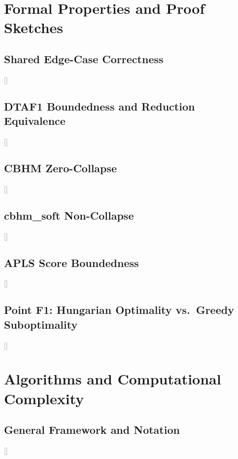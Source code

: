 \documentclass[sigconf]{acmart}
\newcommand{\tbd}[1]{\textcolor{gray}{[#1]}}
\begin{document}
\nocite{*}


\appendix

\section{Formal Properties and Proof Sketches}
\label{app:proofs}

\subsection{Shared Edge-Case Correctness}
\label{app:a1}
\tbd{}

\subsection{DTAF1 Boundedness and Reduction Equivalence}
\label{app:a2}
\tbd{}

\subsection{CBHM Zero-Collapse}
\label{app:a3}
\tbd{}

\subsection{cbhm\_soft Non-Collapse}
\label{app:a4}
\tbd{}

\subsection{APLS Score Boundedness}
\label{app:a5}
\tbd{}

\subsection{Point F1: Hungarian Optimality vs.\ Greedy Suboptimality}
\label{app:a6}
\tbd{}

\section{Algorithms and Computational Complexity}
\label{app:complexity}

\subsection{General Framework and Notation}
\label{app:b1}
\tbd{}
\end{document}
